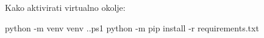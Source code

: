 Kako aktivirati virtualno okolje:

python -m venv venv
.\venv\Scripts\Activate.ps1
python -m pip install -r requirements.txt
